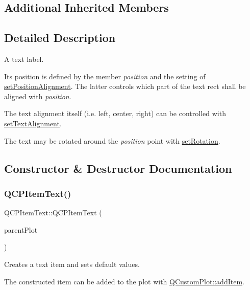 \subsection*{Additional Inherited Members}


\subsection{Detailed Description}
A text label. 

 Its position is defined by the member {\itshape position} and the setting of \mbox{\hyperlink{class_q_c_p_item_text_a781cdf8c640fc6a055dcff1e675c8c7a}{set\+Position\+Alignment}}. The latter controls which part of the text rect shall be aligned with {\itshape position}.

The text alignment itself (i.\+e. left, center, right) can be controlled with \mbox{\hyperlink{class_q_c_p_item_text_ab5bc0684c4d1bed81949a11b34dba478}{set\+Text\+Alignment}}.

The text may be rotated around the {\itshape position} point with \mbox{\hyperlink{class_q_c_p_item_text_a4bcc10cd97952c3f749d75824b5077f0}{set\+Rotation}}. 

\subsection{Constructor \& Destructor Documentation}
\mbox{\label{class_q_c_p_item_text_a77ff96a2972a00872ff8f8c67143abbe}} 
\subsubsection{\texorpdfstring{Q\+C\+P\+Item\+Text()}{QCPItemText()}}
{\footnotesize\ttfamily Q\+C\+P\+Item\+Text\+::\+Q\+C\+P\+Item\+Text (\begin{DoxyParamCaption}\item[{\mbox{\hyperlink{class_q_custom_plot}{Q\+Custom\+Plot}} $\ast$}]{parent\+Plot }\end{DoxyParamCaption})}

Creates a text item and sets default values.

The constructed item can be added to the plot with \mbox{\hyperlink{class_q_custom_plot_aa500620379262321685cb7a7674cbd2a}{Q\+Custom\+Plot\+::add\+Item}}. 

